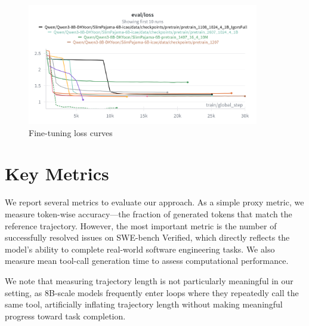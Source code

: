 \begin{figure}[hbt]
  \centering
  \includegraphics[width=0.9\textwidth]{graphs/ft_losses.png}
  \caption{Fine-tuning loss curves}
  \label{fig:ft_losses}
\end{figure}

\section{Key Metrics}
We report several metrics to evaluate our approach.
As a simple proxy metric, we measure token-wise accuracy—the fraction of generated tokens that match the reference trajectory.
However, the most important metric is the number of successfully resolved issues on SWE-bench Verified, which directly reflects the model's ability to complete real-world software engineering tasks.
We also measure mean tool-call generation time to assess computational performance.

We note that measuring trajectory length is not particularly meaningful in our setting, as 8B-scale models frequently enter loops where they repeatedly call the same tool, artificially inflating trajectory length without making meaningful progress toward task completion.




